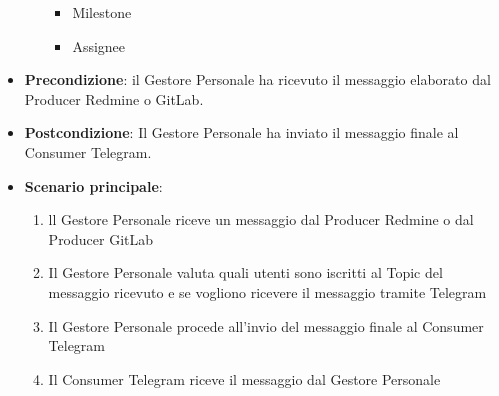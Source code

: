 \begin{itemize}
\begin{itemize}
\begin{itemize}
				\item Milestone
				\item Assignee
			\end{itemize}
		\end{itemize}
		\item \textbf{Precondizione}: il Gestore Personale ha ricevuto il messaggio elaborato dal Producer Redmine o GitLab.
		\item \textbf{Postcondizione}: Il Gestore Personale ha inviato il messaggio finale al Consumer Telegram.
		\item \textbf{Scenario principale}:
		\begin{enumerate}
			\item ll Gestore Personale riceve un messaggio dal Producer Redmine o dal Producer GitLab
			\item Il Gestore Personale valuta quali utenti sono iscritti al Topic del messaggio ricevuto e se vogliono ricevere il messaggio tramite Telegram
			\item Il Gestore Personale procede all'invio del messaggio finale al Consumer Telegram
            \item Il Consumer Telegram riceve il messaggio dal Gestore Personale
		\end{enumerate}

	\end{itemize}

